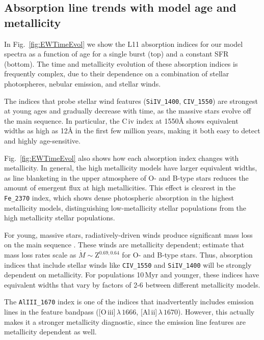\documentclass[preprint2,trackchanges]{aastex62}
\newcommand{\Myr}{$\,$Myr\xspace}
\newcommand{\ang}{\ensuremath{\mbox{\AA}}\xspace}
\begin{document}
\subsection{Absorption line trends with model age and metallicity} \label{sec:mod:abs}

In Fig.~\ref{fig:EWTimeEvol} we show the L11 absorption indices for our model spectra as a function of age for a single burst (top) and a constant SFR (bottom). The time and metallicity evolution of these absorption indices is frequently complex, due to their dependence on a combination of stellar photospheres, nebular emission, and stellar winds.

The indices that probe stellar wind features (\texttt{SiIV\_1400}, \texttt{CIV\_1550}) are strongest at young ages and gradually decrease with time, as the massive stars evolve off the main sequence. In particular, the C{\sc \,iv} index at 1550\ang shows equivalent widths as high as 12\ang in the first few million years, making it both easy to detect and highly age-sensitive.

Fig.~\ref{fig:EWTimeEvol} also shows how each absorption index changes with metallicity. In general, the high metallicity models have larger equivalent widths, as line blanketing in the upper atmosphere of O- and B-type stars reduces the amount of emergent flux at high metallicities. This effect is clearest in the \texttt{Fe\_2370} index, which shows dense photospheric absorption in the highest metallicity models, distinguishing low-metallicity stellar populations from the high metallicity stellar populations. 

For young, massive stars, radiatively-driven winds produce significant mass loss on the main sequence \citep{Kudritzki+2000}. These winds are metallicity dependent; \citet{Vink+2001} estimate that mass loss rates scale as $\dot{M}\sim\mathrm{Z}^{0.69,0.64}$ for O- and B-type stars. Thus, absorption indices that include stellar winds like \texttt{CIV\_1550} and \texttt{SiIV\_1400} will be strongly dependent on metallicity. For populations 10\Myr and younger, these indices have equivalent widths that vary by factors of 2-6 between different metallicity models. 

The \texttt{AlIII\_1670} index is one of the indices that inadvertently includes emission lines in the feature bandpass ([O{\sc \,iii}]$\,\lambda\,1666$, [Al{\sc \,ii}]$\,\lambda\,1670$). However, this actually makes it a stronger metallicity diagnostic, since the emission line features are metallicity dependent as well.
\end{document}
